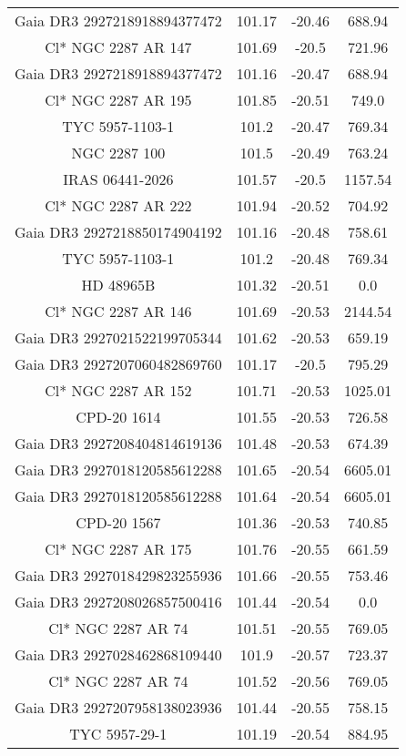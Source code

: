 \begin{table}
\begin{tabular}{cccc}
Gaia DR3 2927218918894377472 & 101.17 & -20.46 & 688.94 \\
Cl* NGC 2287     AR     147 & 101.69 & -20.5 & 721.96 \\
Gaia DR3 2927218918894377472 & 101.16 & -20.47 & 688.94 \\
Cl* NGC 2287     AR     195 & 101.85 & -20.51 & 749.0 \\
TYC 5957-1103-1 & 101.2 & -20.47 & 769.34 \\
NGC  2287   100 & 101.5 & -20.49 & 763.24 \\
IRAS 06441-2026 & 101.57 & -20.5 & 1157.54 \\
Cl* NGC 2287     AR     222 & 101.94 & -20.52 & 704.92 \\
Gaia DR3 2927218850174904192 & 101.16 & -20.48 & 758.61 \\
TYC 5957-1103-1 & 101.2 & -20.48 & 769.34 \\
HD  48965B & 101.32 & -20.51 & 0.0 \\
Cl* NGC 2287     AR     146 & 101.69 & -20.53 & 2144.54 \\
Gaia DR3 2927021522199705344 & 101.62 & -20.53 & 659.19 \\
Gaia DR3 2927207060482869760 & 101.17 & -20.5 & 795.29 \\
Cl* NGC 2287     AR     152 & 101.71 & -20.53 & 1025.01 \\
CPD-20  1614 & 101.55 & -20.53 & 726.58 \\
Gaia DR3 2927208404814619136 & 101.48 & -20.53 & 674.39 \\
Gaia DR3 2927018120585612288 & 101.65 & -20.54 & 6605.01 \\
Gaia DR3 2927018120585612288 & 101.64 & -20.54 & 6605.01 \\
CPD-20  1567 & 101.36 & -20.53 & 740.85 \\
Cl* NGC 2287     AR     175 & 101.76 & -20.55 & 661.59 \\
Gaia DR3 2927018429823255936 & 101.66 & -20.55 & 753.46 \\
Gaia DR3 2927208026857500416 & 101.44 & -20.54 & 0.0 \\
Cl* NGC 2287     AR      74 & 101.51 & -20.55 & 769.05 \\
Gaia DR3 2927028462868109440 & 101.9 & -20.57 & 723.37 \\
Cl* NGC 2287     AR      74 & 101.52 & -20.56 & 769.05 \\
Gaia DR3 2927207958138023936 & 101.44 & -20.55 & 758.15 \\
TYC 5957-29-1 & 101.19 & -20.54 & 884.95 \\

\end{tabular}
\end{table}
